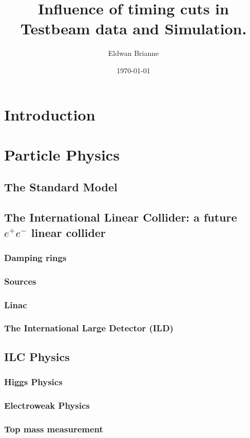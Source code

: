 \documentclass[a4paper,12pt]{report}
\title{Influence of timing cuts in Testbeam data and Simulation.}
\author{Eldwan Brianne}
\date{\today}
\begin{document}
\maketitle

\newpage

\tableofcontents

\chapter{Introduction}

\chapter{Particle Physics}
\section{The Standard Model}
\section{The International Linear Collider: a future $e^+e^-$ linear collider}
\subsection{Damping rings}
\subsection{Sources}
\subsection{Linac}
\subsection{The International Large Detector (ILD)}
\section{ILC Physics}
\subsection{Higgs Physics}
\subsection{Electroweak Physics}
\subsection{Top mass measurement}
\end{document}
